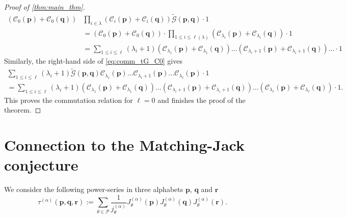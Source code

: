 \documentclass[12pt]{amsart}
\theoremstyle{remark}
\newcommand{\bfp}{\boldsymbol{p}}
\newcommand{\bfq}{\boldsymbol{q}}
\newcommand{\bfr}{\boldsymbol{r}}
\newcommand{\tG}{\widetilde{\mathcal G}}
\newcommand{\C}{\mathcal C}
\newcommand{\YY}{\mathcal{P}}
\begin{document}
\begin{proof}[Proof of \cref{thm:main_thm}]
\begin{align*}
   \left(\C_{0}(\bfp)+\C_{0}(\bfq)\right)
&\prod_{i\in\lambda}\left(\C_i(\bfp)+\C_i(\bfq)\right)\tG(\bfp,\bfq)\cdot1
   \\
   &=\left(\C_{0}(\bfp)+\C_{0}(\bfq)\right)\cdot \prod_{1\leq i\leq \ell(\lambda)}\left(\C_{\lambda_i}(\bfp)+\C_{\lambda_i}(\bfq)\right)\cdot1\\
&=\sum_{1\leq i\leq \ell}(\lambda_i+1)\left(\C_{\lambda_1}(\bfp)+\C_{\lambda_1}(\bfq)\right)\dots
    \left(\C_{\lambda_i+1}(\bfp)+\C_{\lambda_i+1}(\bfq)\right)\dots\cdot 1
\end{align*}
Similarly, the right-hand side of \cref{eq:comm_tG_C0} gives
\begin{multline*}
  \sum_{1\leq i\leq \ell}(\lambda_i+1)\tG(\bfp,\bfq)\C_{\lambda_1}(\bfp)\dots\C_{\lambda_i+1}(\bfp)\dots\C_{\lambda_\ell}(\bfp)\cdot 1\\
    =\sum_{1\leq i\leq \ell}(\lambda_i+1)\left(\C_{\lambda_1}(\bfp)+\C_{\lambda_1}(\bfq)\right)\dots
    \left(\C_{\lambda_i+1}(\bfp)+\C_{\lambda_i+1}(\bfq)\right)\dots\left(\C_{\lambda_\ell}(\bfp)+\C_{\lambda_\ell}(\bfq)\right)\cdot 1.
\end{multline*}
This proves the commutation relation for $\ell=0$ and finishes the proof of the theorem.
\end{proof}



\section{Connection to the Matching-Jack conjecture}\label{sec:connection-MJ}
We consider the following power-series in three alphabets $\bfp$, $\bfq$ and $\bfr$
\begin{equation*}
      \tau^{(\alpha)}(\bfp,\bfq,\bfr):=\sum_{\theta\in \YY}\frac{1}{j^{(\alpha)}_\theta}J^{(\alpha)}_\theta(\bfp)J^{(\alpha)}_\theta(\bfq)J^{(\alpha)}_\theta(\bfr).
\end{equation*}
\end{document}
